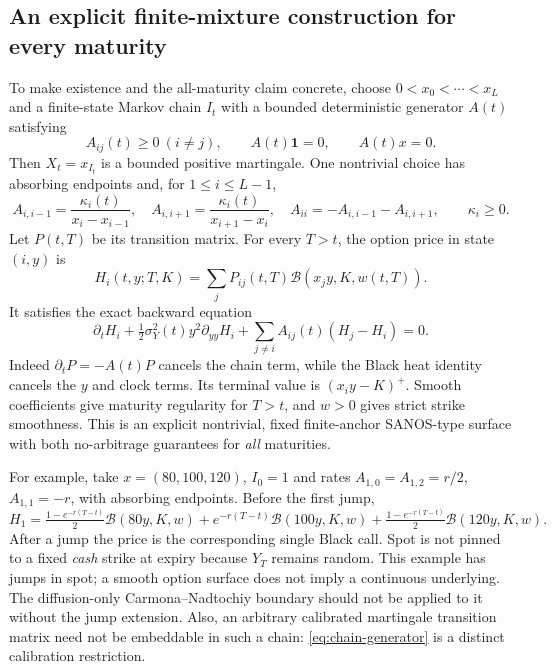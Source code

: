 \documentclass[11pt,a4paper]{article}
\numberwithin{equation}{section}
\theoremstyle{definition}\newtheorem{definition}[theorem]{Definition}
\theoremstyle{remark}\newtheorem{remark}[theorem]{Remark}
\newcommand{\Black}{\mathcal B}\newcommand{\LC}{\mathcal L}
\begin{document}
\subsection{An explicit finite-mixture construction for every maturity}
\label{sec:ctmc}
To make existence and the all-maturity claim concrete, choose $0<x_0<\cdots<x_L$ and a finite-state Markov chain $I_t$ with a bounded deterministic generator $A(t)$ satisfying
\begin{equation}
 A_{ij}(t)\geq0\ (i\ne j),\qquad A(t)\boldsymbol1=0,\qquad A(t)x=0.
 \label{eq:chain-generator}
\end{equation}
Then $X_t=x_{I_t}$ is a bounded positive martingale. One nontrivial choice has absorbing endpoints and, for $1\leq i\leq L-1$,
\begin{equation}
 A_{i,i-1}=\frac{\kappa_i(t)}{x_i-x_{i-1}},\quad
 A_{i,i+1}=\frac{\kappa_i(t)}{x_{i+1}-x_i},\quad
 A_{ii}=-A_{i,i-1}-A_{i,i+1},\qquad \kappa_i\geq0.
 \label{eq:nearest-neighbour}
\end{equation}
Let $P(t,T)$ be its transition matrix. For every $T>t$, the option price in state $(i,y)$ is
\begin{equation}
 H_i(t,y;T,K)=\sum_j P_{ij}(t,T)\Black(x_jy,K,w(t,T)).
 \label{eq:chain-price}
\end{equation}
It satisfies the exact backward equation
\begin{equation}
 \partial_tH_i+\tfrac12\sigma_Y^2(t)y^2\partial_{yy}H_i
 +\sum_{j\ne i}A_{ij}(t)(H_j-H_i)=0.
 \label{eq:chain-pde}
\end{equation}
Indeed $\partial_tP=-A(t)P$ cancels the chain term, while the Black heat identity cancels the $y$ and clock terms. Its terminal value is $(x_i y-K)^+$. Smooth coefficients give maturity regularity for $T>t$, and $w>0$ gives strict strike smoothness. This is an explicit nontrivial, fixed finite-anchor SANOS-type surface with both no-arbitrage guarantees for \emph{all} maturities.

For example, take $x=(80,100,120)$, $I_0=1$ and rates $A_{1,0}=A_{1,2}=r/2$, $A_{1,1}=-r$, with absorbing endpoints. Before the first jump,
\begin{equation}
 H_1=\tfrac{1-e^{-r(T-t)}}2\Black(80y,K,w)
       +e^{-r(T-t)}\Black(100y,K,w)
       +\tfrac{1-e^{-r(T-t)}}2\Black(120y,K,w).
 \label{eq:three-state}
\end{equation}
After a jump the price is the corresponding single Black call. Spot is not pinned to a fixed \emph{cash} strike at expiry because $Y_T$ remains random. This example has jumps in spot; a smooth option surface does not imply a continuous underlying. The diffusion-only Carmona--Nadtochiy boundary should not be applied to it without the jump extension. Also, an arbitrary calibrated martingale transition matrix need not be embeddable in such a chain: \eqref{eq:chain-generator} is a distinct calibration restriction.
\end{document}
